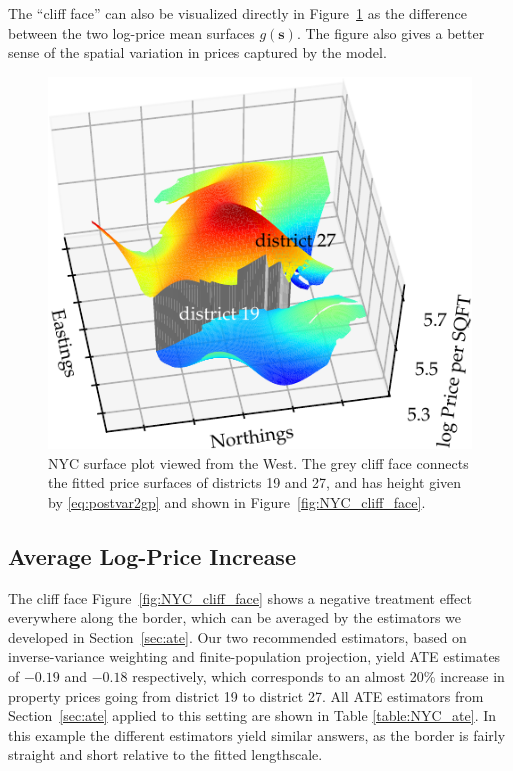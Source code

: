 \documentclass[letter,12pt]{article}
\newcommand{\svec}{\mathbold{s}}
\begin{document}
The ``cliff face'' can also be visualized directly in Figure~\ref{fig:NYC_3d} as the difference between the two log-price mean surfaces \(g(\svec)\).
The figure also gives a better sense of the spatial variation in prices captured by the model.



\begin{figure}[tbp]
    \centering
    \includegraphics[height=0.35\textheight]{../NYC/NYC_plots/NYC_surface_plot_multi_ev60az170-crop.pdf}
    \caption{\label{fig:NYC_3d}NYC surface plot viewed from the West. The grey cliff face connects the fitted price surfaces of districts 19 and 27, and has height given by \eqref{eq:postvar2gp} and shown in Figure~\ref{fig:NYC_cliff_face}.}
\end{figure}



\hypertarget{average-log-price-increase}{%
\subsection{Average Log-Price Increase}\label{average-log-price-increase}}

The cliff face Figure~\ref{fig:NYC_cliff_face} shows a negative treatment effect everywhere along the border, which can be averaged by the estimators we developed in Section~\ref{sec:ate}.
Our two recommended estimators, based on inverse-variance weighting and finite-population projection, yield ATE estimates of \(-0.19\) and \(-0.18\) respectively, which corresponds to an almost 20\% increase in property prices going from district 19 to district 27.
All ATE estimators from Section~\ref{sec:ate} applied to this setting are shown in Table \ref{table:NYC_ate}.
In this example the different estimators yield similar answers, as the border is fairly straight and short relative to the fitted lengthscale.
\end{document}
